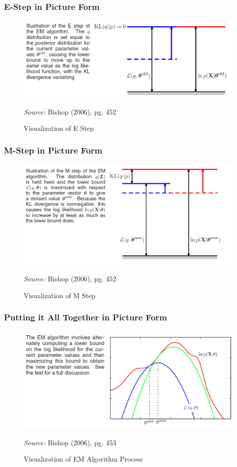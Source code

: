 \documentclass{beamer}
\begin{document}
\begin{frame}
\frametitle{E-Step in Picture Form}
 \begin{figure}
	\centering
	\includegraphics[width=0.7\linewidth]{e_step}
	\caption{Visualization of E Step}
	
	\textit{Source:} Bishop (2006), pg. 452
	\label{fig:e_step}
\end{figure}
\end{frame}

\begin{frame}
\frametitle{M-Step in Picture Form}
 \begin{figure}
	\centering
	\includegraphics[width=0.7\linewidth]{m_step}
	\caption{Visualization of M Step}
	
	\textit{Source:} Bishop (2006), pg. 452
	\label{fig:m_step}
\end{figure}
\end{frame}

\begin{frame}
\frametitle{Putting it All Together in Picture Form}
 \begin{figure}
	\centering
	\includegraphics[width=0.7\linewidth]{em_algorithm}
	\caption{Visualization of EM Algorithm Process}
	
	\textit{Source:} Bishop (2006), pg. 453
	\label{fig:em_algorithm}
\end{figure}
\end{frame}
\end{document}
